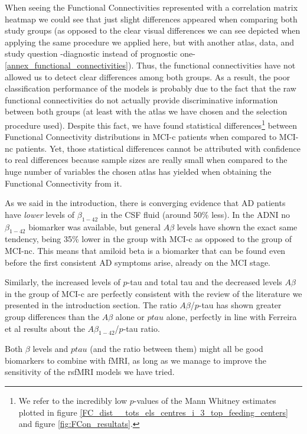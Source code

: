 \documentclass[a4paper,12pt]{elsarticle}  %
\begin{document}
	When seeing the Functional Connectivities represented with a correlation matrix heatmap we could see that just slight differences appeared when comparing both study groups (as opposed to the clear visual differences we can see depicted when applying the same procedure we applied here, but with another atlas, data, and study question -diagnostic instead of prognostic one- \ref{annex_functional_connectivities}). Thus, the functional connectivities have not allowed us to detect clear differences among both groups. As a result, the poor classification performance of the models is probably due to the fact that the raw functional connectivities do not actually provide discriminative information between both groups (at least with the atlas we have chosen and the selection procedure used). Despite this fact, we have found statistical differences\footnote{We refer to the incredibly low $p$-values of the Mann Whitney estimates plotted in figure \ref{FC_dist__tots_els_centres_i_3_top_feeding_centers} and figure \ref{fig:FCon_resultats}.} between Functional Connectivity distributions in MCI-c patients when compared to MCI-nc patients. Yet, those statistical differences cannot be attributed with confidence to real differences because sample sizes are really small when compared to the huge number of variables the chosen atlas has yielded when obtaining the Functional Connectivity from it.
		
	As we said in the introduction, there is converging evidence that AD patients have \textit{lower} levels of $\beta_{1-42}$ in the CSF fluid (around 50\% less)\cite{Henriques2018}. In the ADNI no $\beta_{1-42}$ biomarker was available, but general $A\beta$ levels have shown the exact same tendency, being 35\% lower in the group with MCI-c as opposed to the group of MCI-nc. This means that amiloid beta is a biomarker that can be found even before the first consistent AD symptoms arise, already on the MCI stage.
		
	Similarly, the increased levels of $p$-tau and total tau and the decreased levels $A\beta$ in the group of MCI-c are perfectly consistent with the review of the literature we presented in the introduction section\cite{Diniz2008172, Olsson2016673}. The ratio $A\beta$/$p$-tau has shown greater group differences than the $A\beta$ alone or $ptau$ alone, perfectly in line with Ferreira et al \cite{Ferreira2014} results about the $A\beta_{1-42}$/$p$-tau ratio.
	
	
	 Both $\beta$ levels and $ptau$ (and the ratio between them) might all be good biomarkers to combine with fMRI, as long as we manage to improve the sensitivity of the rsfMRI models we have tried.
		
\end{document}
